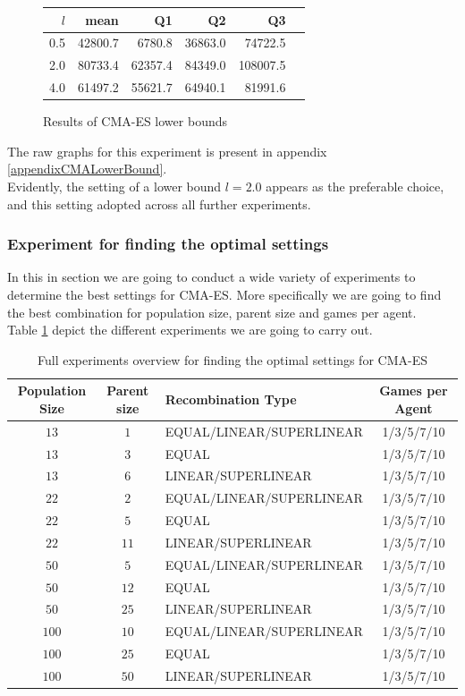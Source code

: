 \begin{figure}[H]
\centering
\begin{tabular}{r | r r r r r}
$l$ & mean & Q1 & Q2 & Q3\\
\hline
0.5 & 42800.7 & 6780.8  & 36863.0 & 74722.5\\
2.0 & 80733.4 & 62357.4 & 84349.0 & 108007.5\\
4.0 & 61497.2 & 55621.7 & 64940.1 & 81991.6\\
\end{tabular}
\caption{Results of CMA-ES lower bounds \label{CMALowerBoundConfigTest}}
\end{figure}
The raw graphs for this experiment is present in appendix \ref{appendixCMALowerBound}.\\
Evidently, the setting of a lower bound $l=2.0$ appears as the preferable choice, and this 
setting adopted across all further experiments.


\subsubsection{Experiment for finding the optimal settings \label{OptimalSettingsCMA}}
In this in section we are going to conduct a wide variety of experiments to determine
the best settings for CMA-ES. More specifically we are going to find the best combination for
population size, parent size and games per agent.\\
Table \ref{SuperCMAExperiment} depict the different experiments we are
going to carry out.

\begin{table}[H]
\centering
\begin{tabular}{c c l c}
Population Size & Parent size & Recombination Type & Games per Agent\\
\hline
$13$ & $1$ & EQUAL/LINEAR/SUPERLINEAR & 1/3/5/7/10\\
$13$ & $3$ & EQUAL & 1/3/5/7/10\\
$13$ & $6$ & LINEAR/SUPERLINEAR & 1/3/5/7/10\\
$22$ & $2$ & EQUAL/LINEAR/SUPERLINEAR & 1/3/5/7/10\\
$22$ & $5$ & EQUAL & 1/3/5/7/10\\
$22$ & $11$ & LINEAR/SUPERLINEAR & 1/3/5/7/10\\
$50$ & $5$ & EQUAL/LINEAR/SUPERLINEAR & 1/3/5/7/10\\
$50$ & $12$ & EQUAL & 1/3/5/7/10\\
$50$ & $25$ & LINEAR/SUPERLINEAR & 1/3/5/7/10\\
$100$ & $10$ & EQUAL/LINEAR/SUPERLINEAR & 1/3/5/7/10\\
$100$ & $25$ & EQUAL & 1/3/5/7/10\\
$100$ & $50$ & LINEAR/SUPERLINEAR & 1/3/5/7/10
\end{tabular}
\caption{Full experiments overview for finding the optimal settings for CMA-ES\label{SuperCMAExperiment}}
\end{table}

